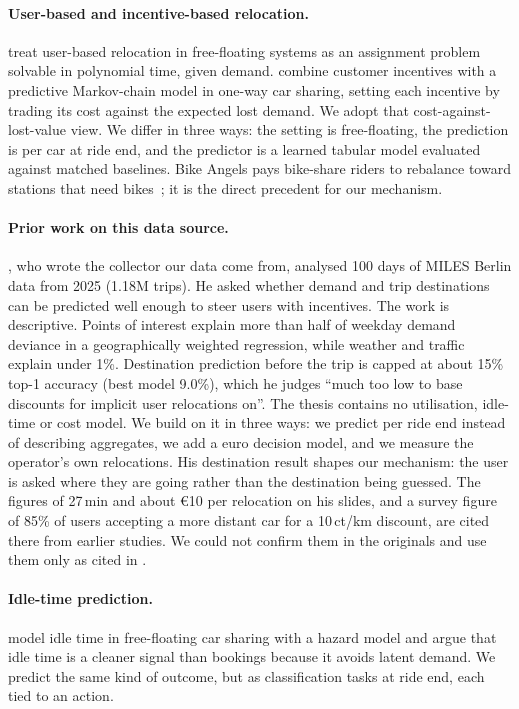 \documentclass[11pt,a4paper]{article}
\newcommand{\eur}[1]{\euro{}#1}
\begin{document}
\paragraph{User-based and incentive-based relocation.} \citet{schiffer2021polynomial} treat user-based relocation in free-floating systems as an assignment problem solvable in polynomial time, given demand. \citet{stokkink2021predictive} combine customer incentives with a predictive Markov-chain model in one-way car sharing, setting each incentive by trading its cost against the expected lost demand. We adopt that cost-against-lost-value view. We differ in three ways: the setting is free-floating, the prediction is per car at ride end, and the predictor is a learned tabular model evaluated against matched baselines. Bike Angels pays bike-share riders to rebalance toward stations that need bikes~\citep{freund2019analytics}; it is the direct precedent for our mechanism.

\paragraph{Prior work on this data source.} \citet{koenig2025thesis}, who wrote the collector our data come from, analysed 100 days of MILES Berlin data from 2025 (1.18M trips). He asked whether demand and trip destinations can be predicted well enough to steer users with incentives. The work is descriptive. Points of interest explain more than half of weekday demand deviance in a geographically weighted regression, while weather and traffic explain under 1\%. Destination prediction before the trip is capped at about 15\% top-1 accuracy (best model 9.0\%), which he judges ``much too low to base discounts for implicit user relocations on''. The thesis contains no utilisation, idle-time or cost model. We build on it in three ways: we predict per ride end instead of describing aggregates, we add a euro decision model, and we measure the operator's own relocations. His destination result shapes our mechanism: the user is asked where they are going rather than the destination being guessed. The figures of 27\,min and about \eur{10} per relocation on his slides, and a survey figure of 85\% of users accepting a more distant car for a 10\,ct/km discount, are cited there from earlier studies. We could not confirm them in the originals and use them only as cited in \citet{koenig2025thesis}.

\paragraph{Idle-time prediction.} \citet{carrone2024idle} model idle time in free-floating car sharing with a hazard model and argue that idle time is a cleaner signal than bookings because it avoids latent demand. We predict the same kind of outcome, but as classification tasks at ride end, each tied to an action.
\end{document}

